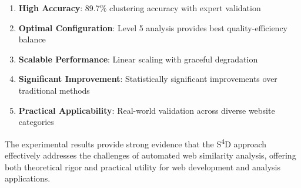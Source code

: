 \begin{enumerate}
    \item \textbf{High Accuracy}: 89.7\% clustering accuracy with expert validation
\item \textbf{Optimal Configuration}: Level 5 analysis provides best quality-efficiency balance
\item \textbf{Scalable Performance}: Linear scaling with graceful degradation
\item \textbf{Significant Improvement}: Statistically significant improvements over traditional methods
\item \textbf{Practical Applicability}: Real-world validation across diverse website categories
\end{enumerate}

The experimental results provide strong evidence that the S\textsuperscript{4}D approach effectively addresses the challenges of automated web similarity analysis, offering both theoretical rigor and practical utility for web development and analysis applications. 